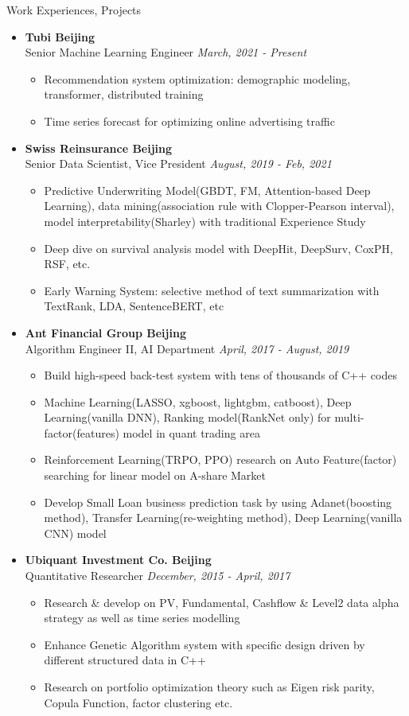 \documentclass[a4paper,8pt,oneside]{scrartcl}
\newenvironment{ressection}[1]{
    \vspace{2pt}
    {\selectfont#1}
    \begin{itemize}
    \vspace{0pt}
}{
    \end{itemize}
}
\newcommand{\ressubitem}[1]{
    \vspace{0pt}
    \item #1
}
\newcommand{\resbigitem}[3]{
    \vspace{-5pt}
    \item
    \textbf{#1}\\
    #2
    \textit{#3}
}
\newenvironment{ressubsec}[3]{
    \resbigitem{#1}{#2}{#3}
    \vspace{-2pt}
    \begin{itemize}
}{
    \end{itemize}
}
\begin{document}
\begin{ressection}{Work Experiences, Projects}
  \begin{ressubsec}{Tubi \hfill Beijing}{Senior Machine Learning Engineer}{\hfill March, 2021 - Present}
	  \ressubitem{Recommendation system optimization: demographic modeling, transformer, distributed training}
	  \ressubitem{Time series forecast for optimizing online advertising traffic}
  \end{ressubsec}
  \begin{ressubsec}{Swiss Reinsurance \hfill Beijing}{Senior Data Scientist, Vice President}{\hfill August, 2019 - Feb, 2021}
	  \ressubitem{Predictive Underwriting Model(GBDT, FM, Attention-based Deep Learning), data mining(association rule with Clopper-Pearson interval), model interpretability(Sharley) with traditional Experience Study}
	  \ressubitem{Deep dive on survival analysis model with DeepHit, DeepSurv, CoxPH, RSF, etc.}
	  \ressubitem{Early Warning System: selective method of text summarization with TextRank, LDA, SentenceBERT, etc}
  \end{ressubsec}
  \begin{ressubsec}{Ant Financial Group \hfill Beijing}{Algorithm Engineer II, AI Department}{\hfill April, 2017 - August, 2019}
	  \ressubitem{Build high-speed back-test system with tens of thousands of C++ codes}
	  \ressubitem{Machine Learning(LASSO, xgboost, lightgbm, catboost), Deep Learning(vanilla DNN), Ranking model(RankNet only) for multi-factor(features) model in quant trading area}
	  \ressubitem{Reinforcement Learning(TRPO, PPO) research on Auto Feature(factor) searching for linear model on A-share Market}
	  \ressubitem{Develop Small Loan business prediction task by using Adanet(boosting method), Transfer Learning(re-weighting method), Deep Learning(vanilla CNN) model}
  \end{ressubsec}
  \begin{ressubsec}{Ubiquant Investment Co. \hfill Beijing}{Quantitative Researcher}{\hfill December, 2015 - April, 2017}
	  \ressubitem{Research \& develop on PV, Fundamental, Cashflow \& Level2 data alpha strategy as well as time series modelling}
	  \ressubitem{Enhance Genetic Algorithm system with specific design driven by different structured data in C++}
      \ressubitem{Research on portfolio optimization theory such as Eigen risk parity, Copula Function, factor clustering etc.}
  \end{ressubsec}


\end{ressection}
\end{document}
